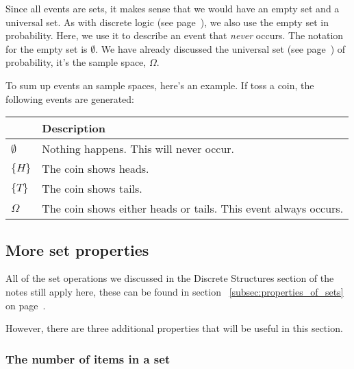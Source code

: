 Since all events are sets, it makes sense that we would have an empty set and a
universal set. As with discrete logic (see page~\pageref{subsubsec:empty_set}),
we also use the empty set in probability. Here, we use it to describe an event
that {\it never} occurs. The notation for the empty set is $\emptyset$. We have
already discussed the universal set (see page~\pageref{subsubsec:universal_set})
of probability, it's the sample space, $\Omega$.


To sum up events an sample spaces, here's an example. If toss a coin, the
following events are generated:

\begin{center}
	\begin{tabular}{|>{\centering\arraybackslash}m{1cm}|m{8cm}|}
		\hline
		{\bf Event} & {\bf Description}\\ \hline
		$\emptyset$ & Nothing happens. This will never occur.\\ \hline
		$\{H\}$     & The coin shows heads.\\ \hline
		$\{T\}$     & The coin shows tails.\\ \hline
		$\Omega$    & The coin shows either heads or tails. This event always occurs.\\
		\hline
	\end{tabular}
\end{center}


\subsection{More set properties}

All of the set operations we discussed in the Discrete Structures section of the
notes still apply here, these can be found in section
~\ref{subsec:properties_of_sets} on page~\pageref{subsec:properties_of_sets}.

However, there are three additional properties that will be useful in this
section.

\subsubsection{The number of items in a set}

